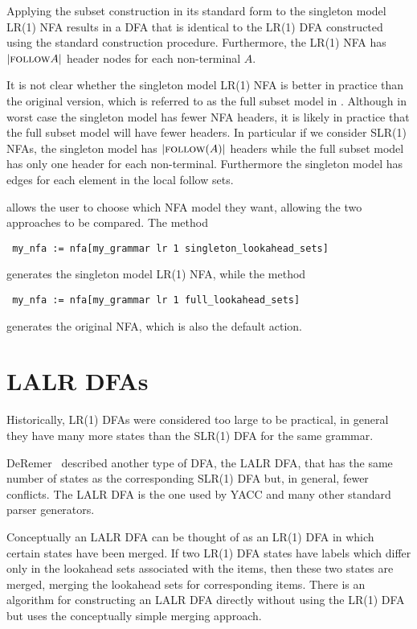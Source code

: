 Applying the subset construction in its standard form to the singleton
model LR(1) NFA results in a DFA that is identical to the LR(1) DFA
constructed using the standard construction procedure. Furthermore,
the LR(1) NFA has $|\mbox{\sc follow}{A}|$ header nodes for each
non-terminal $A$.

It is not clear whether the singleton model LR(1) NFA is better in
practice than the original version, which is referred to as the 
full subset model in \gtbs. Although in worst case the singleton model
has fewer NFA headers, it is likely in practice that the full subset
model will have fewer headers. In particular if we consider SLR(1)
NFAs, the singleton model has $|\mbox{\sc follow}(A)|$ headers while the full
subset model has only one header for each non-terminal. Furthermore
the singleton model has edges for each element in the local follow
sets. 


\gtb allows the user to choose which NFA model they want, allowing the
two approaches to be compared. The method
\begin{center}
\verb+ my_nfa := nfa[my_grammar lr 1 singleton_lookahead_sets]+
\end{center}
generates the singleton model LR(1) NFA, while the method
\begin{center}
\verb+ my_nfa := nfa[my_grammar lr 1 full_lookahead_sets]+
\end{center}
generates the original NFA, which is also the default action.

\section{LALR DFAs}
Historically, LR(1) DFAs were considered too large to be practical, in
general they have many more states than the SLR(1) DFA for the same
grammar.

DeRemer~\cite{DEREMER69,DEREMER71} 
described another type of DFA, the LALR DFA, that has
the same number of states as the corresponding SLR(1) DFA but, in
general, fewer conflicts. The LALR DFA is the one used by YACC and
many other standard parser generators.

Conceptually an LALR DFA can be thought of as an LR(1) DFA in which
certain states have been merged. If two LR(1) DFA states have labels
which differ only in the lookahead sets associated with the items,
then these two states are merged, merging the lookahead sets for
corresponding items. There is an algorithm for constructing an
LALR DFA directly without using the LR(1) DFA but \gtb uses the
conceptually simple merging approach.

